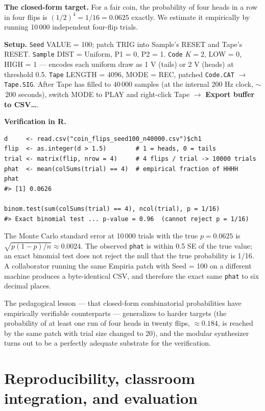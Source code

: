 \textbf{The closed-form target.} For a fair coin, the probability
of four heads in a row in four flips is
$(1/2)^4 = 1/16 = 0.0625$ exactly. We estimate it empirically by
running 10\,000 independent four-flip trials.

\textbf{Setup.} \texttt{Seed} VALUE = 100; patch TRIG into Sample's
RESET and Tape's RESET. \texttt{Sample} DIST = Uniform, P1 = 0, P2
= 1. \texttt{Code} $K = 2$, LOW = 0, HIGH = 1 --- encodes each
uniform draw as 1 V (tails) or 2 V (heads) at threshold 0.5.
\texttt{Tape} LENGTH = 4096, MODE = REC, patched
\texttt{Code.CAT} $\rightarrow$ \texttt{Tape.SIG}. After Tape has
filled to 40\,000 samples (at the internal 200 Hz clock,
$\sim$\,200 seconds), switch MODE to PLAY and right-click Tape
$\rightarrow$ \textbf{Export buffer to CSV\ldots}.

\textbf{Verification in R.}

\begin{verbatim}
d     <- read.csv("coin_flips_seed100_n40000.csv")$ch1
flip  <- as.integer(d > 1.5)        # 1 = heads, 0 = tails
trial <- matrix(flip, nrow = 4)     # 4 flips / trial -> 10000 trials
phat  <- mean(colSums(trial) == 4)  # empirical fraction of HHHH
phat
#> [1] 0.0626

binom.test(sum(colSums(trial) == 4), ncol(trial), p = 1/16)
#> Exact binomial test ... p-value = 0.96  (cannot reject p = 1/16)
\end{verbatim}

The Monte Carlo standard error at 10\,000 trials with the true
$p = 0.0625$ is $\sqrt{p(1-p)/n} \approx 0.0024$. The observed
\texttt{phat} is within 0.5 SE of the true value; an exact binomial
test does not reject the null that the true probability is 1/16. A
collaborator running the same Empiria patch with Seed = 100 on a
different machine produces a byte-identical CSV, and therefore the
exact same \texttt{phat} to six decimal places.

The pedagogical lesson --- that closed-form combinatorial
probabilities have empirically verifiable counterparts ---
generalizes to harder targets (the probability of at least one run
of four heads in twenty flips, $\approx 0.184$, is reached by the
same patch with trial size changed to 20), and the modular
synthesizer turns out to be a perfectly adequate substrate for the
verification.

\section{Reproducibility, classroom integration, and evaluation}\label{repro-classroom}

